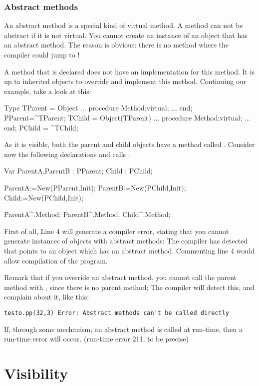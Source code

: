 \documentclass{report}
\begin{document}
\subsubsection{Abstract methods}

An abstract method is a special kind of virtual method. A method can not be
abstract if it is not virtual. You cannot create an instance of an object
that has an abstract method. The reason is obvious: there is no method where
the compiler could jump to !

A method that is declared  does not have an implementation for
this method. It is up to inherited objects to override and implement this 
method. Continuing our example, take a look at this:
\begin{listing}
Type
  TParent = Object 
    ...
    procedure Method;virtual;
    ...
    end;
  PParent=^TParent;
  TChild = Object(TParent) 
    ...
    procedure Method;virtual;
    ...
    end;
  PChild = ^TChild;  
\end{listing}
As it is visible, both the parent and child objects have a method called
. Consider now the following declarations and calls :
\begin{listing}
Var ParentA,ParentB : PParent;
    Child           : PChild;

   ParentA:=New(PParent,Init);
   ParentB:=New(PChild,Init);
   Child:=New(PChild,Init);

   ParentA^.Method;
   ParentB^.Method;
   Child^.Method;
\end{listing}
First of all, Line 4 will generate a compiler error, stating that you cannot
generate instances of objects with abstract methods: The compiler has
detected that  points to an object which has an abstract
method. Commenting line 4 would allow compilation of the program.

Remark that if you override an abstract method, you cannot call the parent
method with , since there is no parent method; The compiler
will detect this, and complain about it, like this:
\begin{verbatim}
testo.pp(32,3) Error: Abstract methods can't be called directly
\end{verbatim}

If, through some mechanism, an abstract method is called at run-time,
then a run-time error will occur. (run-time error 211, to be precise)

\section{Visibility}
\end{document}
